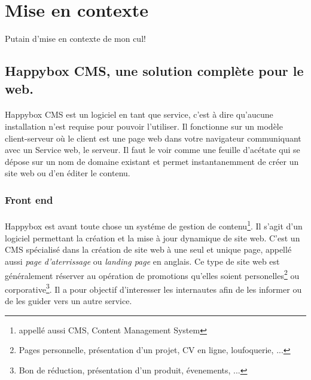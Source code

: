 \documentclass[11pt, a4paper ]{article}
\let\stdsection\section
\renewcommand\section{\newpage\stdsection}
\begin{document}
		\section{Mise en contexte} %
Putain d'mise en contexte de mon cul!

			\subsection{Happybox CMS, une solution complète pour le web.}

\paragraph{}
Happybox CMS est un logiciel en tant que service, c'est à dire qu'aucune installation n'est requise pour pouvoir l'utiliser. Il fonctionne sur un modèle client-serveur où le client est une page web dans votre navigateur communiquant avec un Service web, le serveur. Il faut le voir comme une feuille d'acétate qui se dépose sur un nom de domaine existant et permet instantanemment de créer un site web ou d'en éditer le contenu.

\subsubsection{Front end}
	\paragraph{}
Happybox est avant toute chose un systéme de gestion de contenu\footnote{appellé aussi CMS, Content Management System}. Il s'agit d'un logiciel permettant la création et la mise à jour dynamique de site web.
C'est un CMS spécialisé dans la création de site web à une seul et unique page, appellé aussi \emph{page d'aterrissage} ou \emph{landing page} en anglais. Ce type de site web est généralement réserver au opération de promotions qu'elles soient personelles\footnote{Pages personnelle, présentation d'un projet, CV en ligne, loufoquerie, ...} ou corporative\footnote{Bon de réduction, présentation d'un produit, évenements, ...}. Il a pour objectif d'interesser les internautes afin de les informer ou de les guider vers un autre service.
\end{document}
